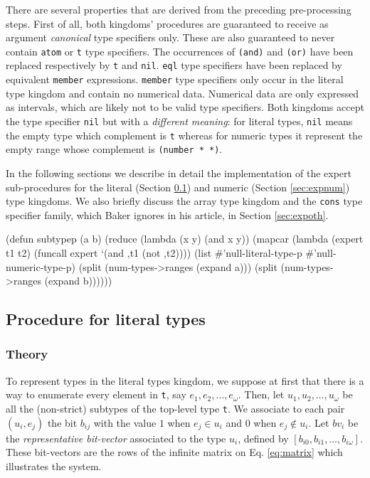\documentclass[format=sigconf]{acmart}
\newcommand\code[2][\small]{\sloppy\texttt{#1#2}}
\theoremstyle{definition}
\begin{document}
There are several properties that are derived from the preceding pre-processing
steps. First of all, both kingdoms' procedures are guaranteed to receive as
argument \emph{canonical} type specifiers only. These are also guaranteed to never
contain \code{atom} or \code{t} type specifiers. The occurrences of \code{(and)}
and \code{(or)} have been replaced respectively by \code{t} and \code{nil}.
\code{eql} type specifiers have been replaced by equivalent \code{member} expressions.
\code{member} type specifiers only occur in the literal type kingdom and contain
no numerical data. Numerical data are only expressed as intervals, which are likely
not to be valid type specifiers. Both kingdoms accept the type specifier
\code{nil} but with a \emph{different meaning}: for literal types, \code{nil}
means the empty type which complement is \code{t} whereas for numeric types it
represent the empty range whose complement is \code{(number * *)}.

In the following sections we describe in detail the implementation of the expert
sub-procedures for the literal (Section \ref{sec:explit}) and numeric
(Section \ref{sec:expnum}) type kingdoms. We also briefly discuss
the array type kingdom and the \code{cons} type specifier family,
which Baker ignores in his article, in Section \ref{sec:expoth}.

\begin{listing}
\begin{clcode}
(defun subtypep (a b)
  (reduce (lambda (x y) (and x y))
          (mapcar (lambda (expert t1 t2)
                    (funcall expert `(and ,t1 (not ,t2))))
                  (list #'null-literal-type-p
                        #'null-numeric-type-p)
                  (split (num-types->ranges (expand a)))
                  (split (num-types->ranges (expand b))))))
\end{clcode}
\caption{A top-down approach of \code{subtypep}}
\label{lst:tdstp}
\end{listing}

\subsection{Procedure for literal types}
\label{sec:explit}
\subsubsection{Theory}
To represent types in the literal types kingdom, we suppose at first that there
is a way to enumerate every element in \code{t}, say $e_1, e_2, \dots, e_\omega$.
Then, let $u_1, u_2, \dots, u_\omega$ be all the (non-strict) subtypes of the
top-level type \code{t}. We associate to each pair $\left(u_i, e_j\right)$ the
bit $b_{ij}$ with the value $1$ when $e_j \in u_i$ and $0$ when $e_j \notin u_i$.
Let $bv_i$ be the \emph{representative bit-vector} associated to the type $u_i$,
defined by $\left[b_{i0}, b_{i1}, \dots, b_{i\omega}\right]$. These
bit-vectors are the rows of the infinite matrix on Eq. \ref{eq:matrix} which
illustrates the system.
\end{document}
